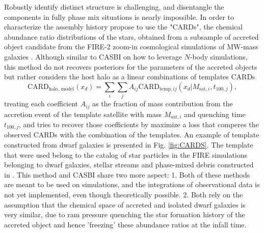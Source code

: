 


Robustly identify distinct structure is challenging, and disentangle the components in fully phase mix situations is nearly impossible. In order to characterize the assembly history \cite{cunninghamReadingCARDsImprint2022}
propose to use the "CARDs", the chemical abundance ratio distributions of the stars, obtained from a subsample of accreted object candidate from the FIRE-2 zoom-in cosmological simulations of MW-mass galaxies \cite{wetzelRECONCILINGDWARFGALAXIES2016}. 
Although similar to CASBI on how to leverage $N$-body simulations, this method do not recovers posteriors for the parameters of the accreted objects
but rather considers the host halo as a linear combinations of templates CARDs \begin{equation}
    \text{CARD}_{\text{halo, model}} (x_d) = \sum_i \sum_j A_{ij} \text{CARD}_{\text{temp}, ij} (x_d|M_{\text{sat}, i}, t_{100, j}),
\end{equation} 
treating each coefficient $A_{ij}$ as the fraction of mass contribution from the accretion event of the template satellite with mass $M_{\text{sat}, i}$ and quenching time $t_{100, j}$, and tries to recover those coefficients by maximize a loss that comperes the observed CARDs with the combination of the templates. An example of template constructed from dwarf galaxies is presented in Fig. \ref{fig:CARDS}. The template that were used belong to the catalog of star particles in the FIRE simulations belonging to dwarf galaxies, stellar streams and phase-mixed debris constructed in \cite{panithanpaisalGalaxyProgenitorsStellar2021}. This method and CASBI share two more aspect: 1. Both of these methods are meant to be used on simulations, and the integrations of observational data is not yet implemented, even though theoretically possible. 2. Both rely on the assumption that the chemical space of accreted and isolated dwarf galaxies is very similar, due to ram pressure quenching the star formation history of the accreted object and hence 'freezing' these abundance ratios at the infall time. 


